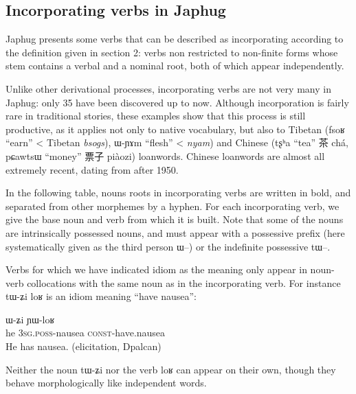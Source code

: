 \documentclass[oldfontcommands,oneside,a4paper,11pt]{article}
\newcommand{\ipa}[1]{{\phon #1}} %
\newcommand{\zh}[1]{{\cn #1}}
\newcommand{\const}{\textsc{const}}
\newcommand{\poss}{\textsc{poss}}
\newcommand{\sg}{\textsc{sg}}
\begin{document}

 \subsection{Incorporating verbs in Japhug} \label{subsec:incorp.list}
Japhug presents some verbs that can be described as incorporating according to the definition given in section 2: verbs non restricted to non-finite forms whose stem contains a verbal and a nominal root, both of which appear independently.

 Unlike other derivational processes, incorporating verbs are not very many in Japhug: only  35 have been discovered up to now. Although incorporation is fairly rare in traditional stories, these examples show that this process is still productive, as it applies not only to native vocabulary, but also to Tibetan (\ipa{fsoʁ} ``earn'' < Tibetan \textit{bsogs}), \ipa{ɯ-ɲɤm} ``flesh'' < \textit{nyam}) and Chinese (\ipa{tʂʰa} ``tea'' \zh{茶} chá, \ipa{pɕawtsɯ} ``money'' \zh{票子} piàozi) loanwords. Chinese loanwords are almost all extremely recent, dating from after 1950.



In the following table, nouns roots in incorporating verbs are written in bold, and separated from other morphemes by a hyphen. For each incorporating verb, we give the base noun and verb from which it is built. Note that some of the nouns are intrinsically possessed nouns, and must appear with a possessive prefix (here systematically given as the third person \ipa{ɯ}--) or the indefinite possessive \ipa{tɯ}--.  


Verbs for which we have indicated \ipa{idiom} as the meaning only appear in noun-verb collocations with the same noun as in the incorporating verb. For instance \ipa{tɯ-ʑi} \ipa{loʁ} is an idiom meaning ``have nausea'':
 \begin{exe}
\ex
\gll  \ipa{ɯʑo} \ipa{ɯ-ʑi} \ipa{ɲɯ-loʁ}  \\
 he 3\sg{}.\poss{}-nausea \const{}-have.nausea \\
 \glt He has nausea. (elicitation, Dpalcan)
\end{exe}  
Neither  the noun \ipa{tɯ-ʑi} nor the verb \ipa{loʁ} can appear on their own, though they behave morphologically like independent words. 
 
\end{document}
